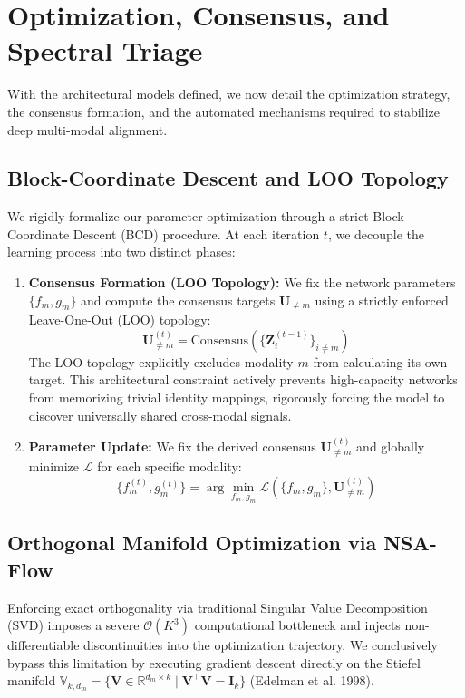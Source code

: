 \documentclass[
  letterpaper,
]{report}
\begin{document}
\section{Optimization, Consensus, and Spectral
Triage}\label{optimization-consensus-and-spectral-triage}

With the architectural models defined, we now detail the optimization
strategy, the consensus formation, and the automated mechanisms required
to stabilize deep multi-modal alignment.

\subsection{Block-Coordinate Descent and LOO
Topology}\label{block-coordinate-descent-and-loo-topology}

We rigidly formalize our parameter optimization through a strict
Block-Coordinate Descent (BCD) procedure. At each iteration \(t\), we
decouple the learning process into two distinct phases:

\begin{enumerate}
\def\labelenumi{\arabic{enumi}.}
\item
  \textbf{Consensus Formation (LOO Topology):} We fix the network
  parameters \(\{f_m, g_m\}\) and compute the consensus targets
  \(\mathbf{U}_{\neq m}\) using a strictly enforced Leave-One-Out (LOO)
  topology:
  \[ \mathbf{U}_{\neq m}^{(t)} = \text{Consensus}(\{\mathbf{Z}_i^{(t-1)}\}_{i \neq m}) \]
  The LOO topology explicitly excludes modality \(m\) from calculating
  its own target. This architectural constraint actively prevents
  high-capacity networks from memorizing trivial identity mappings,
  rigorously forcing the model to discover universally shared
  cross-modal signals.
\item
  \textbf{Parameter Update:} We fix the derived consensus
  \(\mathbf{U}_{\neq m}^{(t)}\) and globally minimize \(\mathcal{L}\)
  for each specific modality:
  \[ \{f_m^{(t)}, g_m^{(t)}\} = \arg\min_{f_m, g_m} \mathcal{L}(\{f_m, g_m\}, \mathbf{U}_{\neq m}^{(t)}) \]
\end{enumerate}

\subsection{Orthogonal Manifold Optimization via
NSA-Flow}\label{orthogonal-manifold-optimization-via-nsa-flow}

Enforcing exact orthogonality via traditional Singular Value
Decomposition (SVD) imposes a severe \(\mathcal{O}(K^3)\) computational
bottleneck and injects non-differentiable discontinuities into the
optimization trajectory. We conclusively bypass this limitation by
executing gradient descent directly on the Stiefel manifold
\(\mathbb{V}_{k,d_m} = \{ \mathbf{V} \in \mathbb{R}^{d_m \times k} \mid \mathbf{V}^\top \mathbf{V} = \mathbf{I}_k \}\)
(Edelman et al. 1998).
\end{document}
